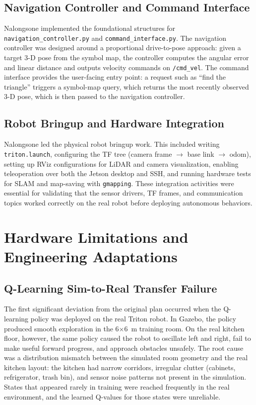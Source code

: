 \documentclass[letterpaper, 10 pt, conference]{ieeeconf/ieeeconf}
\begin{document}
\subsection{Navigation Controller and Command Interface}

Nalongsone implemented the foundational structures for \texttt{navigation\_controller.py}
and \texttt{command\_interface.py}.
The navigation controller was designed around a proportional drive-to-pose
approach: given a target 3-D pose from the symbol map, the controller computes
the angular error and linear distance and outputs velocity commands on
\texttt{/cmd\_vel}.
The command interface provides the user-facing entry point: a request
such as ``find the triangle'' triggers a symbol-map query, which returns
the most recently observed 3-D pose, which is then passed to the navigation
controller.

\subsection{Robot Bringup and Hardware Integration}

Nalongsone led the physical robot bringup work.
This included writing \texttt{triton.launch}, configuring the TF tree
(camera frame $\to$ base link $\to$ odom), setting up RViz configurations
for LiDAR and camera visualization, enabling teleoperation over both the
Jetson desktop and SSH, and running hardware tests for SLAM and map-saving
with \texttt{gmapping}.
These integration activities were essential for validating that the sensor
drivers, TF frames, and communication topics worked correctly on the real robot
before deploying autonomous behaviors.

\section{Hardware Limitations and Engineering Adaptations}
\label{sec:adaptations}

\subsection{Q-Learning Sim-to-Real Transfer Failure}

The first significant deviation from the original plan occurred when
the Q-learning policy was deployed on the real Triton robot.
In Gazebo, the policy produced smooth exploration in the 6$\times$6~m
training room.
On the real kitchen floor, however, the same policy caused the robot to
oscillate left and right, fail to make useful forward progress, and
approach obstacles unsafely.
The root cause was a distribution mismatch between the simulated room geometry
and the real kitchen layout: the kitchen had narrow corridors, irregular
clutter (cabinets, refrigerator, trash bin), and sensor noise patterns
not present in the simulation.
States that appeared rarely in training were reached frequently in the real
environment, and the learned Q-values for those states were unreliable.
\end{document}
